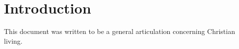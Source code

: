 \section{Introduction}
\noindent
This document was written to be a general articulation concerning Christian living.
\\

\noindent
\blindtext
\\
